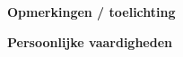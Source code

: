 \documentclass[12pt]{article}
\newcommand{\myCheckBox}[1]{%
  \checkBox[\symbolchoice{cross}]{#1}{10bp}{10bp}{On}%
}
\begin{document}

\noindent\textbf{Opmerkingen / toelichting}\\
\newpage


\newpage

\noindent\textbf{\Large Persoonlijke vaardigheden}\hfill
\vspace{2 mm}
\end{document}

